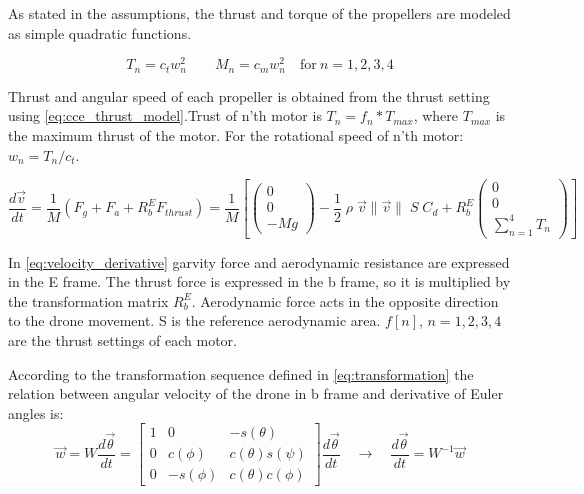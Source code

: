 As stated in the assumptions, the thrust and torque of the propellers are modeled as simple quadratic functions. 

\begin{equation}
\label{eq:cce_thrust_model}
    T_n = c_t w_n^2 \quad \quad M_n = c_m w_n^2 \quad \textrm{for} \ n = 1,2,3,4
\end{equation}

Thrust and angular speed of each propeller is obtained from the thrust setting using \autoref{eq:cce_thrust_model}.Trust of n'th motor is $T_n = f_n * T_{max}$, where $T_{max}$ is the maximum thrust of the motor. For the rotational speed of n'th motor: $w_n = T_n/c_t$. 

\begin{equation}
\label{eq:velocity_derivative}
   \frac{d\vec{v}}{dt} = \frac{1}{M} \left( F_g + F_a + R^E_b F_{thrust}\right)
   = \frac{1}{M} \left[
   \begin{pmatrix}
    0 \\
    0 \\
    -Mg
    \end{pmatrix} -
    \frac{1}{2} \; \rho \; \vec{v} \| \vec{v}\| \; S \; C_d  +
    R^E_b
    \begin{pmatrix}
    0 \\
    0 \\
    \sum_{n=1}^{4} T_n
    \end{pmatrix}
    \right]
\end{equation}

In \autoref{eq:velocity_derivative} garvity force and aerodynamic resistance are expressed in the E frame. The thrust force is expressed in the b frame, so it is multiplied by the transformation matrix $R^E_b$. Aerodynamic force acts in the opposite direction to the drone movement. S is the reference aerodynamic area. $f[n]$, $n=1,2,3,4$ are the thrust settings of each motor. 


According to the transformation sequence defined in \autoref{eq:transformation} the relation between angular velocity of the drone in b frame and derivative of Euler angles is:
\begin{equation}
\label{eq:angles_derivative}
   \vec{w} =  
   W \frac{d\vec{\theta}}{dt} =
   \begin{bmatrix}
     1 & 0 & -s(\theta)\\
     0 & c(\phi) & c(\theta)s(\psi)\\
     0 & -s(\phi) & c(\theta)c(\phi)
    \end{bmatrix}
   \frac{d\vec{\theta}}{dt}
   \quad \rightarrow \quad
   \frac{d\vec{\theta}}{dt} = W^{-1} \vec{w}
\end{equation}

